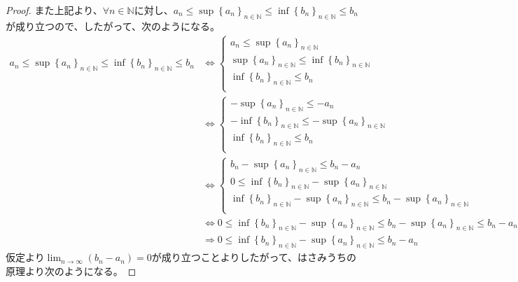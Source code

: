 \documentclass[dvipdfmx]{jsarticle}
\begin{document}
\begin{proof}
また上記より、$\forall n \in \mathbb{N}$に対し、$a_{n} \leq {\sup\left\{ a_{n} \right\}}_{n \in \mathbb{N}} \leq {\inf\left\{ b_{n} \right\}}_{n \in \mathbb{N}} \leq b_{n}$が成り立つので、したがって、次のようになる。
\begin{align*}
a_{n} \leq {\sup\left\{ a_{n} \right\}}_{n \in \mathbb{N}} \leq {\inf\left\{ b_{n} \right\}}_{n \in \mathbb{N}} \leq b_{n} &\Leftrightarrow \left\{ \begin{matrix}
a_{n} \leq {\sup\left\{ a_{n} \right\}}_{n \in \mathbb{N}} \\
\sup\left\{ a_{n} \right\}_{n \in \mathbb{N}} \leq {\inf\left\{ b_{n} \right\}}_{n \in \mathbb{N}} \\
\inf\left\{ b_{n} \right\}_{n \in \mathbb{N}} \leq b_{n} \\
\end{matrix} \right.\ \\
&\Leftrightarrow \left\{ \begin{matrix}
 - {\sup\left\{ a_{n} \right\}}_{n \in \mathbb{N}} \leq - a_{n} \\
 - {\inf\left\{ b_{n} \right\}}_{n \in \mathbb{N}} \leq - {\sup\left\{ a_{n} \right\}}_{n \in \mathbb{N}} \\
{\inf\left\{ b_{n} \right\}}_{n \in \mathbb{N}} \leq b_{n} \\
\end{matrix} \right.\ \\
&\Leftrightarrow \left\{ \begin{matrix}
b_{n} - {\sup\left\{ a_{n} \right\}}_{n \in \mathbb{N}} \leq b_{n} - a_{n} \\
0 \leq {\inf\left\{ b_{n} \right\}}_{n \in \mathbb{N}} - {\sup\left\{ a_{n} \right\}}_{n \in \mathbb{N}} \\
{\inf\left\{ b_{n} \right\}}_{n \in \mathbb{N}} - {\sup\left\{ a_{n} \right\}}_{n \in \mathbb{N}} \leq b_{n} - {\sup\left\{ a_{n} \right\}}_{n \in \mathbb{N}} \\
\end{matrix} \right.\ \\
&\Leftrightarrow 0 \leq {\inf\left\{ b_{n} \right\}}_{n \in \mathbb{N}} - {\sup\left\{ a_{n} \right\}}_{n \in \mathbb{N}} \leq b_{n} - {\sup\left\{ a_{n} \right\}}_{n \in \mathbb{N}} \leq b_{n} - a_{n}\\
&\Rightarrow 0 \leq {\inf\left\{ b_{n} \right\}}_{n \in \mathbb{N}} - {\sup\left\{ a_{n} \right\}}_{n \in \mathbb{N}} \leq b_{n} - a_{n}
\end{align*}
仮定より$\lim_{n \rightarrow \infty}\left( b_{n} - a_{n} \right) = 0$が成り立つことよりしたがって、はさみうちの原理より次のようになる。

\end{proof}
\end{document}
